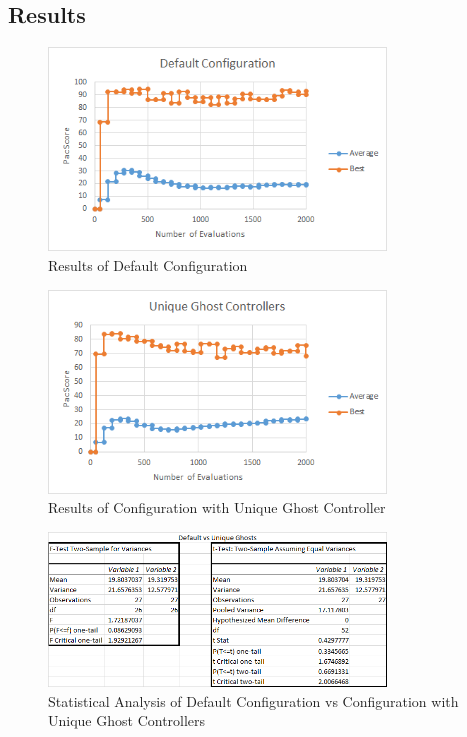 \documentclass{article}
\begin{document}
\subsection{Results}
\begin{flushleft}
\begin{figure}[h]
	\centering
	\includegraphics[width=0.8\textwidth]{default}
	\caption{Results of Default Configuration}
\end{figure}

\begin{figure}[h]
	\centering
	\includegraphics[width=0.8\textwidth]{uniqueGhost}
	\caption{Results of Configuration with Unique Ghost Controller}
\end{figure}
\end{flushleft}

\clearpage

\begin{flushleft}
\begin{figure}[h]
	\centering
	\includegraphics[width=0.8\textwidth]{statDefaultVsUniqueGhost}
	\caption{Statistical Analysis of Default Configuration vs Configuration with Unique Ghost Controllers}
\end{figure}
\end{flushleft}
\end{document}
